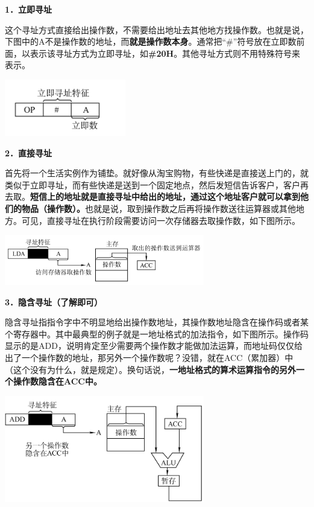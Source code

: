{\textbf{1．立即寻址}}

这个寻址方式直接给出操作数，不需要给出地址去其他地方找操作数。也就是说，下图中的A不是操作数的地址，而\textbf{就是操作数本身}。通常把``\#''符号放在立即数前面，以表示该寻址方式为立即寻址，如\textbf{\#20H}。其他寻址方式则不用特殊符号来表示。

\includegraphics[width=2.08333in,height=0.96875in]{png-jpeg-pics/1217CD46D18068794B47170C8560B3F8.png}

{\textbf{2．直接寻址}}

首先将一个生活实例作为铺垫。就好像从淘宝购物，有些快递是直接送上门的，就类似于立即寻址，而有些快递是送到一个固定地点，然后发短信告诉客户，客户再去取。\textbf{短信上的地址就是直接寻址中给出的地址，通过这个地址客户就可以拿到他们的物品（操作数）。}也就是说，取到操作数之后再将操作数送往运算器或其他地方。可见，直接寻址在执行阶段需要访问一次存储器去取操作数，如下图所示。

\includegraphics[width=3.43750in,height=0.86458in]{png-jpeg-pics/316231AD55846BF7C576AA754E41385C.png}

{\textbf{3．隐含寻址（了解即可）}}

隐含寻址指指令字中不明显地给出操作数地址，其操作数地址隐含在操作码或者某个寄存器中。其中最典型的例子就是一地址格式的加法指令，如下图所示。操作码显示的是ADD，说明肯定至少需要两个操作数才能做加法运算，而地址码仅仅给出了一个操作数的地址，那另外一个操作数呢？没错，就在ACC（累加器）中（这个没有为什么，就是规定）。换句话说，\textbf{一地址格式的算术运算指令的另外一个操作数隐含在ACC中。}

\textbf{\includegraphics[width=3.43750in,height=1.83333in]{png-jpeg-pics/3930ABDAB3E51036A984314FE155DF51.png}\\
}

